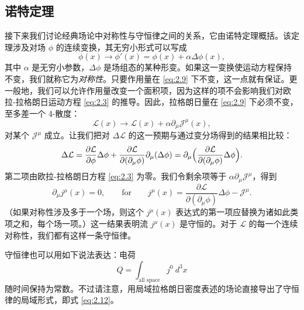 \subsection*{诺特定理}

接下来我们讨论经典场论中对称性与守恒律之间的关系，它由诺特定理概括。该定理涉及对场 $\phi$ 的连续变换，其无穷小形式可以写成
\begin{equation}
  \phi(x) \to \phi'(x) = \phi(x) + \alpha\Delta\phi(x),
  \label{eq:2.9}
\end{equation}
其中 $\alpha$ 是无穷小参数，$\Delta\phi$ 是场组态的某种形变。如果这一变换使运动方程保持不变，我们就称它为\emph{对称性}。只要作用量在 \eqref{eq:2.9} 下不变，这一点就有保证。更一般地，我们可以允许作用量改变一个面积项，因为这样的项不会影响我们对欧拉-拉格朗日运动方程 \eqref{eq:2.3} 的推导。因此，拉格朗日量在 \eqref{eq:2.9} 下必须不变，至多差一个 4-散度：
\begin{equation}
  \mathcal{L}(x) \to \mathcal{L}(x) + \alpha\partial_\mu\mathcal{J}^\mu(x),
  \label{eq:2.10}
\end{equation}
对某个 $\mathcal{J}^\mu$ 成立。让我们把对 $\Delta\mathcal{L}$ 的这一预期与通过变分场得到的结果相比较：
\begin{equation}
  \Delta\mathcal{L}
  = \frac{\partial\mathcal{L}}{\partial\phi}\Delta\phi
    + \frac{\partial\mathcal{L}}{\partial(\partial_\mu\phi)}
      \partial_\mu(\Delta\phi)
  = \partial_\mu\Bigl(
      \frac{\partial\mathcal{L}}{\partial(\partial_\mu\phi)}
      \Delta\phi \Bigr).
  \label{eq:2.11}
\end{equation}
第二项由欧拉-拉格朗日方程 \eqref{eq:2.3} 为零。我们令剩余项等于 $\alpha\partial_\mu\mathcal{J}^\mu$，得到
\begin{equation}
  \partial_\mu j^\mu(x) = 0,
  \qquad\text{for}\qquad
  j^\mu(x) = \frac{\partial\mathcal{L}}{\partial(\partial_\mu\phi)}
    \Delta\phi - \mathcal{J}^\mu .
  \label{eq:2.12}
\end{equation}
（如果对称性涉及多于一个场，则这个 $j^\mu(x)$ 表达式的第一项应替换为诸如此类项之和，每个场一项。）这一结果表明流 $j^\mu(x)$ 是守恒的。对于 $\mathcal{L}$ 的每一个连续对称性，我们都有这样一条守恒律。

守恒律也可以用如下说法表达：电荷
\begin{equation}
  Q = \int_{\text{all space}} j^0\ d^3x
  \label{eq:2.13}
\end{equation}
随时间保持为常数。不过请注意，用局域拉格朗日密度表述的场论直接导出了守恒律的局域形式，即式 \eqref{eq:2.12}。

